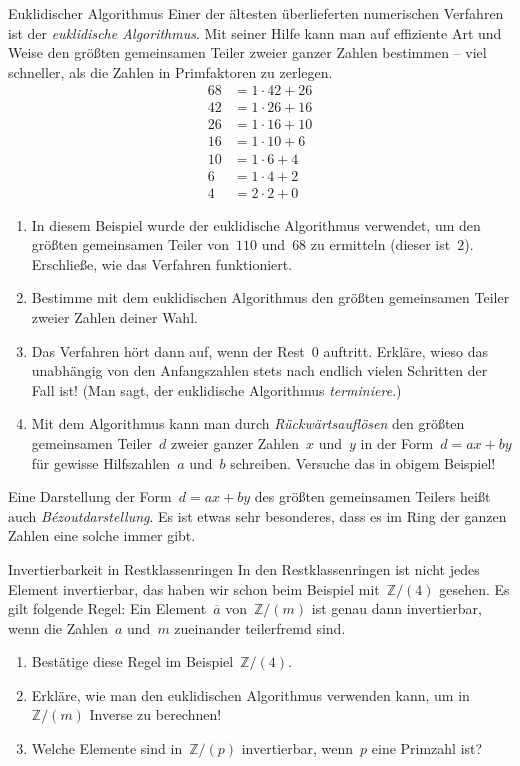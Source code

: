 \documentclass{zirkelblatt}
\newcommand{\ol}[1]{\ensuremath{\overline{#1}}}
\newcommand{\ZZ}{\mathbb{Z}}
\begin{document}
\begin{aufgabe}{Euklidischer Algorithmus}
Einer der ältesten überlieferten numerischen Verfahren ist der
\emph{euklidische Algorithmus}. Mit seiner Hilfe kann man auf effiziente Art und Weise
den größten gemeinsamen Teiler zweier ganzer Zahlen bestimmen -- viel
schneller, als die Zahlen in Primfaktoren zu zerlegen.
\begin{align*}
    68 &= 1 \cdot 42 + 26 \\
    42 &= 1 \cdot 26 + 16 \\
    26 &= 1 \cdot 16 + 10 \\
    16 &= 1 \cdot 10 + 6 \\
    10 &= 1 \cdot 6 + 4 \\
    6 &= 1 \cdot 4 + 2 \\
    4 &= 2 \cdot 2 + 0
\end{align*}
\begin{enumerate}
\item In diesem Beispiel wurde der euklidische Algorithmus verwendet, um den
größten gemeinsamen Teiler von~$110$ und~$68$ zu ermitteln (dieser ist~$2$).
Erschließe, wie das Verfahren funktioniert.
\item Bestimme mit dem euklidischen Algorithmus den größten gemeinsamen Teiler
zweier Zahlen deiner Wahl.
\item Das Verfahren hört dann auf, wenn der Rest~$0$ auftritt. Erkläre, wieso
das unabhängig von den Anfangszahlen stets nach endlich vielen Schritten der
Fall ist! (Man sagt, der euklidische Algorithmus \emph{terminiere}.)
\item Mit dem Algorithmus kann man durch \emph{Rückwärtsauflösen} den größten
gemeinsamen Teiler~$d$ zweier ganzer Zahlen~$x$ und~$y$ in der Form~$d = ax +
by$ für gewisse Hilfszahlen~$a$ und~$b$ schreiben. Versuche das in obigem
Beispiel!
\end{enumerate}
Eine Darstellung der Form~$d = ax + by$ des größten gemeinsamen Teilers heißt
auch \emph{Bézoutdarstellung}. Es ist etwas sehr besonderes, dass es im Ring
der ganzen Zahlen eine solche immer gibt.
\end{aufgabe}

\begin{aufgabe}{Invertierbarkeit in Restklassenringen}
In den Restklassenringen ist nicht jedes Element invertierbar, das haben wir
schon beim Beispiel mit~$\ZZ/(4)$ gesehen. Es gilt folgende Regel: Ein
Element~$\ol{a}$ von~$\ZZ/(m)$ ist genau dann invertierbar, wenn die Zahlen~$a$
und~$m$ zueinander teilerfremd sind.
\begin{enumerate}
\item Bestätige diese Regel im Beispiel~$\ZZ/(4)$.
\item Erkläre, wie man den euklidischen Algorithmus verwenden kann, um
in~$\ZZ/(m)$ Inverse zu berechnen!
\item Welche Elemente sind in~$\ZZ/(p)$ invertierbar, wenn~$p$ eine Primzahl
ist?
\end{enumerate}
\end{aufgabe}
\end{document}
